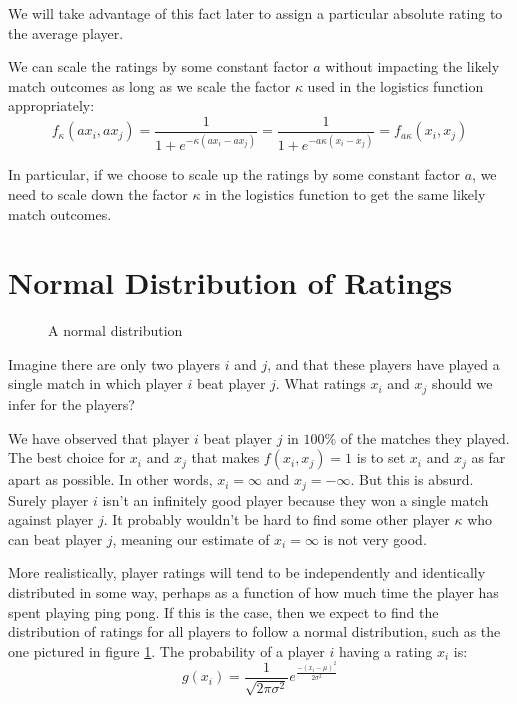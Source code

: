 \documentclass{article}
\begin{document}
We will take advantage of this fact later to assign a particular absolute
rating to the average player.

We can scale the ratings by some constant factor $a$ without impacting the
likely match outcomes as long as we scale the factor $\kappa$ used in the
logistics function appropriately:
\begin{equation*}
  f_\kappa(a x_i, a x_j) =
  \frac{1}{1 + e^{-\kappa(a x_i - a x_j)}} =
  \frac{1}{1 + e^{-a \kappa(x_i - x_j)}} = f_{a \kappa}(x_i, x_j)
\end{equation*}

In particular, if we choose to scale up the ratings by some constant factor
$a$, we need to scale down the factor $\kappa$ in the logistics function to get the
same likely match outcomes.

\section{Normal Distribution of Ratings}
\begin{figure}
  \caption{A normal distribution}
  \label{fig:normal}
 \end{figure}
Imagine there are only two players $i$ and $j$, and that these players have
played a single match in which player $i$ beat player $j$. What ratings $x_i$
and $x_j$ should we infer for the players?

We have observed that player $i$ beat player $j$ in $100\%$ of the matches
they played. The best choice for $x_i$ and $x_j$ that makes $f(x_i, x_j) = 1$
is to set $x_i$ and $x_j$ as far apart as possible. In other words,
$x_i = \infty$ and $x_j = -\infty$. But this is absurd. Surely player $i$
isn't an infinitely good player because they won a single match against player
$j$. It probably wouldn't be hard to find some other player $\kappa$ who can beat
player $j$, meaning our estimate of $x_i = \infty$ is not very good.

More realistically, player ratings will tend to be independently and
identically distributed in some way, perhaps as a function of how much time
the player has spent playing ping pong. If this is the case, then we expect to
find the distribution of ratings for all players to follow a normal
distribution, such as the one pictured in figure \ref{fig:normal}. The
probability of a player $i$ having a rating $x_i$ is:
\begin{equation}
  g(x_i) = \frac{1}{\sqrt{2\pi\sigma^2}} e^{\frac{-(x_i - \mu)^2}{2 \sigma^2}}
\end{equation}
\end{document}
